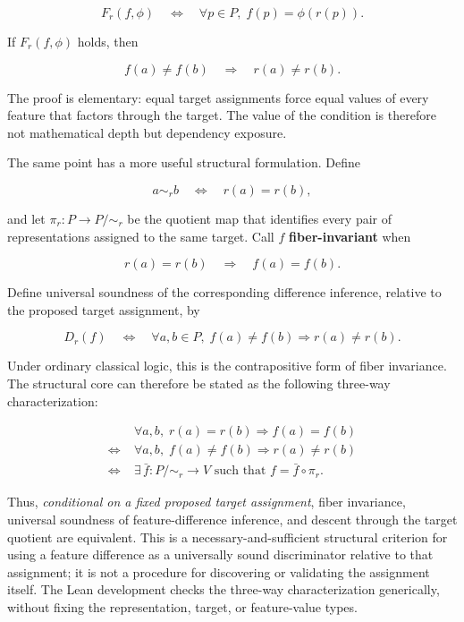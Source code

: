 \documentclass[11pt]{article}
\begin{document}
\[
F_r(f,\phi)
\quad\Longleftrightarrow\quad
\forall p\in P,\; f(p)=\phi(r(p)).
\]

If \(F_r(f,\phi)\) holds, then

\[
f(a)\neq f(b)
\quad\Longrightarrow\quad
r(a)\neq r(b).
\]

The proof is elementary: equal target assignments force equal values of every feature that factors through the target. The value of the condition is therefore not mathematical depth but dependency exposure.

The same point has a more useful structural formulation. Define

\[
a\sim_r b
\quad\Longleftrightarrow\quad
r(a)=r(b),
\]

and let \(\pi_r:P\to P/{\sim_r}\) be the quotient map that identifies every pair of representations assigned to the same target. Call \(f\) \textbf{fiber-invariant} when

\[
r(a)=r(b)
\quad\Longrightarrow\quad
f(a)=f(b).
\]

Define universal soundness of the corresponding difference inference, relative to the proposed target assignment, by

\[
D_r(f)
\quad\Longleftrightarrow\quad
\forall a,b\in P,\;
f(a)\neq f(b)\Longrightarrow r(a)\neq r(b).
\]

Under ordinary classical logic, this is the contrapositive form of fiber invariance. The structural core can therefore be stated as the following three-way characterization:

\[
\boxed{
\begin{aligned}
&\forall a,b,\;r(a)=r(b)\Rightarrow f(a)=f(b) \\
\Longleftrightarrow\;&
\forall a,b,\;f(a)\neq f(b)\Rightarrow r(a)\neq r(b) \\
\Longleftrightarrow\;&
\exists\,\bar f:P/{\sim_r}\to V
\text{ such that }f=\bar f\circ\pi_r .
\end{aligned}
}
\]

Thus, \emph{conditional on a fixed proposed target assignment}, fiber invariance, universal soundness of feature-difference inference, and descent through the target quotient are equivalent. This is a necessary-and-sufficient structural criterion for using a feature difference as a universally sound discriminator relative to that assignment; it is not a procedure for discovering or validating the assignment itself. The Lean development checks the three-way characterization generically, without fixing the representation, target, or feature-value types.
\end{document}
